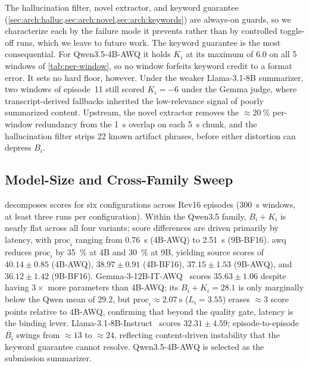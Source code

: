 \documentclass[conference,letterpaper]{IEEEtran}
\begin{document}
The hallucination filter, novel extractor, and keyword guarantee (\cref{sec:arch:halluc,sec:arch:novel,sec:arch:keywords}) are always-on guards, so we characterize each by the failure mode it prevents rather than by controlled toggle-off runs, which we leave to future work.
The keyword guarantee is the most consequential.
For Qwen3.5-4B-AWQ it holds $K_i$ at its maximum of \num{6.0} on all \num{5} windows of \cref{tab:per-window}, so no window forfeits keyword credit to a format error.
It sets no hard floor, however.
Under the weaker Llama-3.1-8B summarizer, two windows of episode~\num{11} still scored $K_i = -6$ under the Gemma judge, where transcript-derived fallbacks inherited the low-relevance signal of poorly summarized content.
Upstream, the novel extractor removes the $\approx\SI{20}{\percent}$ per-window redundancy from the \SI{1}{\second} overlap on each \SI{5}{\second} chunk, and the hallucination filter strips \num{22} known artifact phrases, before either distortion can depress $B_i$.

\subsection{Model-Size and Cross-Family Sweep}
\label{sec:eval:sweep}

 decomposes scores for six configurations across Rev16 episodes (\SI{300}{\second} windows, at least three runs per configuration).
Within the Qwen3.5 family, $B_i + K_i$ is nearly flat across all four variants; score differences are driven primarily by latency, with $\text{proc}_i$ ranging from \SI{0.76}{\second} (4B-AWQ) to \SI{2.51}{\second} (9B-BF16).
\Gls{awq} reduces $\text{proc}_i$ by \SI{35}{\percent} at 4B and \SI{30}{\percent} at 9B, yielding source scores of $40.14 \pm 0.85$ (4B-AWQ), $38.97 \pm 0.91$ (4B-BF16), $37.15 \pm 1.53$ (9B-AWQ), and $36.12 \pm 1.42$ (9B-BF16).
Gemma-3-12B-IT-AWQ~\cite{gemma3-12b-awq} scores $35.63 \pm 1.06$ despite having $3\times$ more parameters than 4B-AWQ; its $B_i + K_i = 28.1$ is only marginally below the Qwen mean of $29.2$, but $\text{proc}_i \approx \SI{2.07}{\second}$ ($L_i = 3.55$) erases $\approx\num{3}$ score points relative to 4B-AWQ, confirming that beyond the quality gate, latency is the binding lever.
Llama-3.1-8B-Instruct~\cite{llama3-8b} scores $32.31 \pm 4.59$; episode-to-episode $\overline{B_i}$ swings from $\approx 13$ to $\approx 24$, reflecting content-driven instability that the keyword guarantee cannot resolve.
Qwen3.5-4B-AWQ is selected as the submission summarizer.
\end{document}
